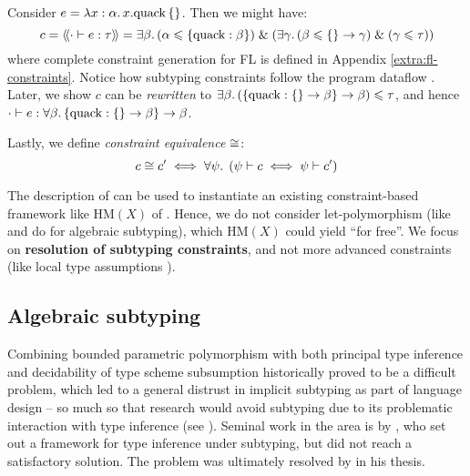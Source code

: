 \begin{example}
    Consider $e = \lambda {x: \alpha} \ldotp {x}{.}{\mathrm{quack}}\,\{\}$. Then we might have:
    $$ c = \cstr{\cdot}{e}{\tau} = \exists \beta \ldotp (\alpha \sub \flrec{\mathrm{quack}: \beta}) \und \left( \exists \gamma \ldotp (\beta \sub \flrec{} \to \gamma) \und (\gamma \sub \tau) \right) $$
    where complete constraint generation for FL is defined in Appendix \ref{extra:fl-constraints}. Notice how subtyping constraints follow the program dataflow \cite{mlsub}.
    Later, we show $c$ can be \emph{rewritten} to $\exists \beta \ldotp (\flrec{\mathrm{quack} : \flrec{} \to \beta} \to \beta) \sub \tau$, and hence $\cdot \vdash e : \forall \beta \ldotp \flrec{\mathrm{quack} : \flrec{} \to \beta} \to \beta$.
\end{example}

Lastly, we define \emph{constraint equivalence} $\cong$:
$$ c \cong c' \iff  \forall \psi \ldotp \; (\psi \vdash c \iff \psi \vdash c') $$

The description of \inference{} can be used to instantiate an existing constraint-based framework like $\mathrm{HM}(X)$ of \textcite{constraint-based-hm}. Hence, we do not consider let-polymorphism (like \textcite{dolan-thesis} and \textcite{simple-sub} do for algebraic subtyping), which $\mathrm{HM}(X)$ could yield \enquote{for free}. We focus on \textbf{resolution of subtyping constraints}, and not more advanced constraints (like local type assumptions \cite{outside-in}).


\subsection{Algebraic subtyping}
\label{subsec:algebraic-subtyping-background}

Combining bounded parametric polymorphism with both principal type inference and decidability of type scheme subsumption historically proved to be a difficult problem, which led to a general distrust in implicit subtyping as part of language design \cite{mlstruct} -- so much so that research would avoid subtyping due to its problematic interaction with type inference (see \eg{} \cite[Section~3.5]{linear-haskell}). Seminal work in the area is by \textcite{pottier-thesis}, who set out a framework for type inference under subtyping, but did not reach a satisfactory solution. The problem was ultimately resolved by \textcite{dolan-thesis} in his thesis.

